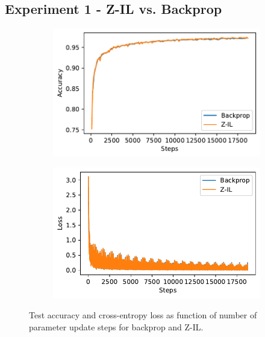 \documentclass[a4paper,11pt]{article} %
\begin{document}
\subsection{Experiment 1 - Z-IL vs. Backprop}
\begin{figure}[ht]
  \begin{subfigure}[]{0.49\linewidth}
    \includegraphics[width=\linewidth]{graphics/Z-IL-backprop-accuracy.pdf}
  \end{subfigure}
  \hfill
  \begin{subfigure}[]{0.49\linewidth}
    \includegraphics[width=\linewidth]{graphics/Z-IL-backprop-loss.pdf}
  \end{subfigure}

  \caption{Test accuracy and cross-entropy loss as function of number of parameter update steps for backprop and Z-IL.}
  \label{fig:Z-IL-backprop-comparison}
\end{figure} 
\end{document}
